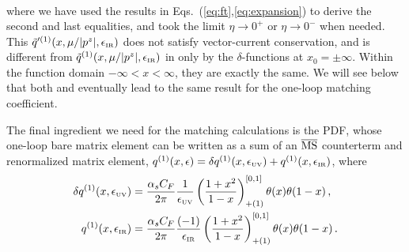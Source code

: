 \begin{widetext}
\begin{align}
\end{align}
where we have used the results in Eqs.~(\ref{eq:ft},\ref{eq:expansion}) to derive the second and last equalities, and took the limit $\eta\to 0^+$ or $\eta\to 0^-$ when needed.  This $\tilde{q}'^{(1)}(x,\mu/|p^z|,\epsilon_{\mbox{\tiny IR}})$ does not satisfy vector-current conservation, and is different from $\tilde{q}^{(1)}(x,\mu/|p^z|,\epsilon_{\mbox{\tiny IR}})$ in  only by the $\delta$-functions at $x_0=\pm\infty$. Within the function domain $-\infty < x < \infty$, they are exactly the same.  We will see below that both  and  eventually lead to the same result for the one-loop matching coefficient.


The final ingredient we need for the matching calculations is the PDF, whose one-loop bare matrix element can be written as a sum of an $\overline{\rm MS}$ counterterm and renormalized matrix element, $q^{(1)}(x,\epsilon) = \delta q^{(1)}(x,\epsilon_{\mbox{\tiny UV}})+q^{(1)}(x,\epsilon_{\mbox{\tiny IR}})$, where
\begin{align}
 \delta q^{(1)}(x,\epsilon_{\mbox{\tiny UV}}) &= 	{\alpha_sC_F\over 2\pi} {1\over \epsilon_{\mbox{\tiny UV}}} \left({1+x^2\over 1-x}\right)^{[0,1]}_{+(1)}  \theta(x)\theta(1-x)
  \,, \\
 q^{(1)}(x,\epsilon_{\mbox{\tiny IR}}) &= 	{\alpha_sC_F\over 2\pi} {(-1)\over \epsilon_{\mbox{\tiny IR}}} \left({1+x^2\over 1-x}\right)^{[0,1]}_{+(1)} \theta(x)\theta(1-x)
  \,. \nonumber
\end{align}


\end{widetext}
